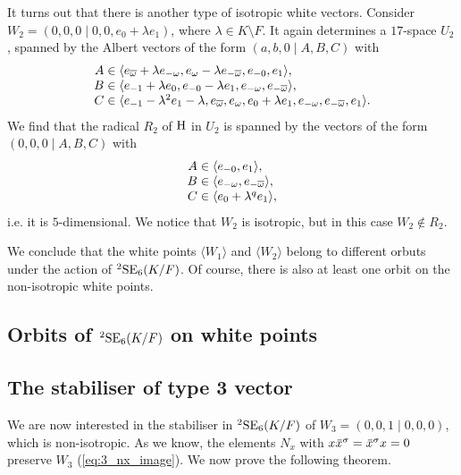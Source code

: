 It turns out that there is another type of isotropic white vectors. Consider 
$W_2 = (0,0,0 \mid 0,0,e_0 + \lambda e_1)$, where $\lambda \in K\setminus F$. It again determines a 
$17$-space $U_2$, spanned by the Albert vectors of the form $(a,b,0\mid A,B,C)$ with 
\begin{equation}
	\begin{array}{r@{\;}c@{\;}l}
		A & \in & \langle e_{\bar{\omega}}+\lambda e_{-\omega}, e_{\omega}-\lambda e_{-\bar{\omega}}
		, e_{-0}, e_1
		\rangle, \\
		B & \in & \langle e_{-1}+\lambda e_0, e_{-0} - \lambda e_1,
	e_{-\omega}, e_{-\bar{\omega}}  \rangle, \\
		C & \in & \langle e_{-1}-\lambda^2 e_1 - \lambda, e_{\bar{\omega}}, e_{\omega},
	e_0 + \lambda e_1, e_{-\omega}, e_{-\bar{\omega}}, e_1 \rangle.
	\end{array}
\end{equation}
We find that the radical $R_2$ of $\mathrm{H}$ in $U_2$ is spanned by the vectors of the form 
$(0,0,0\mid A,B,C)$ with 
\begin{equation}
	\begin{array}{r@{\;}c@{\;}l}
		A & \in & \langle e_{-0}, e_1 \rangle, \\
		B & \in & \langle e_{-\omega}, e_{-\bar{\omega}} \rangle, \\
		C & \in & \langle e_0 + \lambda^q e_1 \rangle,
	\end{array}
\end{equation}
i.e. it is $5$-dimensional. We notice that $W_2$ is isotropic, but in this case $W_2 \not\in R_2$.

We conclude that the white points $\langle W_1 \rangle$ and $\langle W_2 \rangle$ belong to different
orbuts under the action of ${}^2\mathrm{SE}_6(K/F)$. Of course, there is also at least one orbit on the 
non-isotropic white points. 

\subsection{Orbits of ${}^2\mathrm{SE}_6(K/F)$ on white points}

\subsection{The stabiliser of type 3 vector}

We are now interested in the stabiliser in ${}^2\mathrm{SE}_6(K/F)$ of 
$W_3 = (0,0,1\mid 0,0,0)$, which is non-isotropic. As we know, the elements
$N_x$ with $x\ovx^{\s} = \ovx^{\s}x = 0$ preserve $W_3$ (\ref{eq:3_nx_image}).
We now prove the following theorem.

